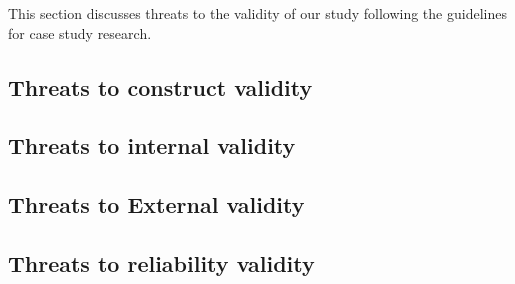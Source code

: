 \label{threats}
This section discusses threats to the validity of our study following the guidelines for case study research.
\subsection{Threats to construct validity}



\subsection{Threats to internal validity}




\subsection{Threats to External validity}


\subsection{Threats to reliability validity} 
